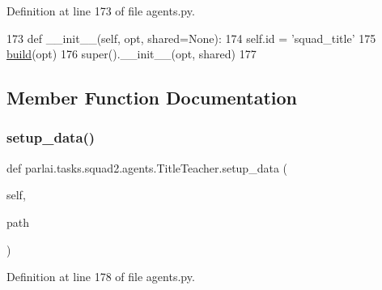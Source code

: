 Definition at line 173 of file agents.\+py.


\begin{DoxyCode}
173     \textcolor{keyword}{def }\_\_init\_\_(self, opt, shared=None):
174         self.id = \textcolor{stringliteral}{'squad\_title'}
175         \hyperlink{namespaceparlai_1_1mturk_1_1tasks_1_1talkthewalk_1_1download_a8c0fbb9b6dfe127cb8c1bd6e7c4e33fd}{build}(opt)
176         super().\_\_init\_\_(opt, shared)
177 
\end{DoxyCode}


\subsection{Member Function Documentation}
\mbox{\label{classparlai_1_1tasks_1_1squad2_1_1agents_1_1TitleTeacher_aef7bf6b95b4e6d87052ee193145db9f1}} 
\subsubsection{\texorpdfstring{setup\+\_\+data()}{setup\_data()}}
{\footnotesize\ttfamily def parlai.\+tasks.\+squad2.\+agents.\+Title\+Teacher.\+setup\+\_\+data (\begin{DoxyParamCaption}\item[{}]{self,  }\item[{}]{path }\end{DoxyParamCaption})}



Definition at line 178 of file agents.\+py.


